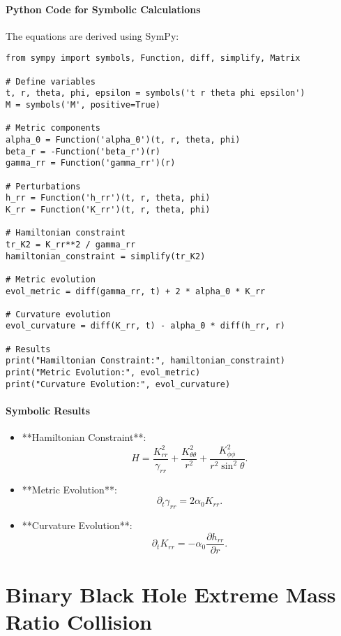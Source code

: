 \documentclass[12pt]{article}
\begin{document}
\paragraph{Python Code for Symbolic Calculations}
The equations are derived using SymPy:
\begin{verbatim}
from sympy import symbols, Function, diff, simplify, Matrix

# Define variables
t, r, theta, phi, epsilon = symbols('t r theta phi epsilon')
M = symbols('M', positive=True)

# Metric components
alpha_0 = Function('alpha_0')(t, r, theta, phi)
beta_r = -Function('beta_r')(r)
gamma_rr = Function('gamma_rr')(r)

# Perturbations
h_rr = Function('h_rr')(t, r, theta, phi)
K_rr = Function('K_rr')(t, r, theta, phi)

# Hamiltonian constraint
tr_K2 = K_rr**2 / gamma_rr
hamiltonian_constraint = simplify(tr_K2)

# Metric evolution
evol_metric = diff(gamma_rr, t) + 2 * alpha_0 * K_rr

# Curvature evolution
evol_curvature = diff(K_rr, t) - alpha_0 * diff(h_rr, r)

# Results
print("Hamiltonian Constraint:", hamiltonian_constraint)
print("Metric Evolution:", evol_metric)
print("Curvature Evolution:", evol_curvature)
\end{verbatim}

\paragraph{Symbolic Results}
\begin{itemize}
    \item **Hamiltonian Constraint**:
    \[
    H = \frac{K_{rr}^2}{\gamma_{rr}} + \frac{K_{\theta\theta}^2}{r^2} + \frac{K_{\phi\phi}^2}{r^2 \sin^2\theta}.
    \]
    \item **Metric Evolution**:
    \[
    \partial_t \gamma_{rr} = 2\alpha_0 K_{rr}.
    \]
    \item **Curvature Evolution**:
    \[
    \partial_t K_{rr} = -\alpha_0 \frac{\partial h_{rr}}{\partial r}.
    \]
\end{itemize}

\section{Binary Black Hole Extreme Mass Ratio Collision}
\end{document}
